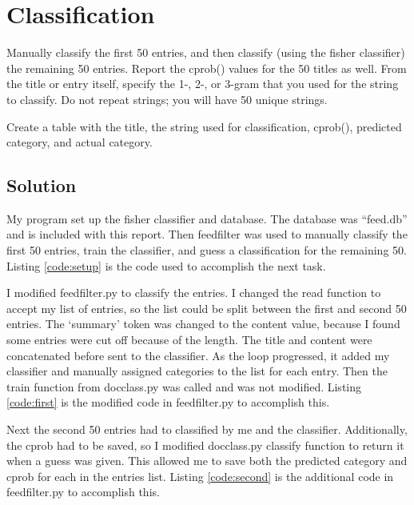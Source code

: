 \documentclass[paper=a4, fontsize=11pt]{scrartcl} %
\numberwithin{equation}{section} %
\numberwithin{figure}{section} %
\numberwithin{table}{section} %
\begin{document}
\section{Classification}
Manually classify the first 50 entries, and then classify (using
the fisher classifier) the remaining 50 entries. Report the cprob()
values for the 50 titles as well.  From the title or entry itself,
specify the 1-, 2-, or 3-gram that you used for the string to
classify.  Do not repeat strings; you will have 50 unique strings.

Create a table with the title, the string used for classification,
cprob(), predicted category, and actual category.

\subsection{Solution}
My program set up the fisher classifier and database.
The database was ``feed.db'' and is included with this report.
Then feedfilter was used to manually classify the first 50 entries, train the classifier, and guess a classification for the remaining 50.
Listing \ref{code:setup} is the code used to accomplish the next task.\cite{bib:collective}



I modified feedfilter.py to classify the entries.  
I changed the read function to accept my list of entries, so the list could be split between the first and second 50 entries.
The `summary' token was changed to the content value, because I found some entries were cut off because of the length.
The title and content were concatenated before sent to the classifier.
As the loop progressed, it added my classifier and manually assigned categories to the list for each entry.
Then the train function from docclass.py was called and was not modified.
Listing \ref{code:first} is the modified code in feedfilter.py to accomplish this.\cite{bib:collective}



Next the second 50 entries had to classified by me and the classifier.
Additionally, the cprob had to be saved, so I modified docclass.py classify function to return it when a guess was given.
This allowed me to save both the predicted category and cprob for each in the entries list.
Listing \ref{code:second} is the additional code in feedfilter.py to accomplish this.\cite{bib:collective}

\end{document}
